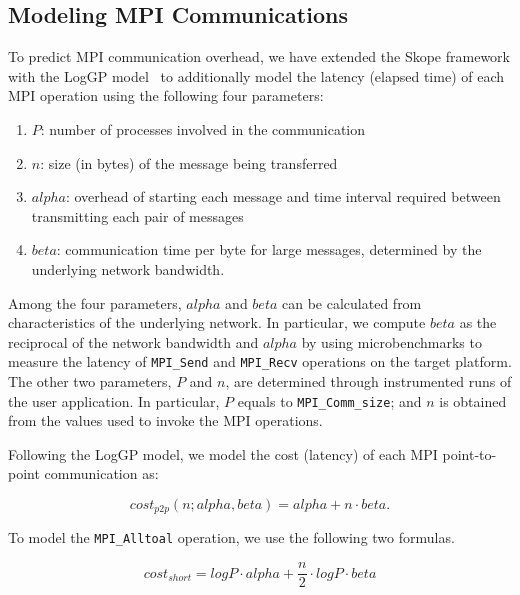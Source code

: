 \subsection{Modeling MPI Communications}

To predict MPI communication overhead, we have extended the Skope framework with the LogGP
model~\cite{loggp} to additionally model the latency (elapsed time) of
each MPI operation using the following four parameters:

\begin{enumerate}

\item $P$: number of processes involved in the communication

\item $n$: size (in bytes) of the message being transferred

\item $alpha$: overhead of starting each message and time interval
  required between transmitting each pair of messages

\item $beta$: communication time per byte for large messages,
  determined by the underlying network bandwidth.

\end{enumerate}

Among the four parameters, $alpha$ and $beta$ can be calculated from
characteristics of the underlying network.  In particular, we compute
$beta$ as the reciprocal of the network bandwidth and $alpha$ by using
microbenchmarks to measure the latency of \texttt{MPI\_Send} and
\texttt{MPI\_Recv} operations on the target platform.  The other two
parameters, $P$ and $n$, are determined through instrumented
runs of the user application.
In particular,
$P$ equals to \texttt{MPI\_Comm\_size}; and $n$ 
is obtained from the values used to invoke the MPI operations.

Following the LogGP model, we model the cost (latency) of each MPI point-to-point communication
as:

\begin{equation}
cost_{p2p}(n;alpha,beta) = alpha + n\cdot beta .
\end{equation}

To model the \texttt{MPI\_Alltoal} operation, we use the following two
formulas.

\begin{equation}
  cost_{short} = log P\cdot alpha + \frac{n}{2}\cdot log P\cdot beta
\end{equation}

